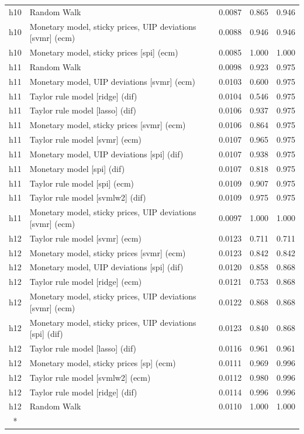 \begin{ThreePartTable}
\begin{longtable}[t]{cp{5.5cm}ccc}
h10 & \raggedright Random Walk & 0.0087 & 0.865 & 0.946\\
h10 & \raggedright Monetary model, sticky prices, UIP deviations [svmr] (ecm) & 0.0088 & 0.946 & 0.946\\
h10 & \raggedright Monetary model, sticky prices [spi] (ecm) & 0.0085 & 1.000 & 1.000\\
\addlinespace
h11 & \raggedright Random Walk & 0.0098 & 0.923 & 0.975\\
h11 & \raggedright Monetary model, UIP deviations [svmr] (ecm) & 0.0103 & 0.600 & 0.975\\
h11 & \raggedright Taylor rule model [ridge] (dif) & 0.0104 & 0.546 & 0.975\\
h11 & \raggedright Taylor rule model [lasso] (dif) & 0.0106 & 0.937 & 0.975\\
h11 & \raggedright Monetary model, sticky prices [svmr] (ecm) & 0.0106 & 0.864 & 0.975\\
h11 & \raggedright Taylor rule model [svmr] (ecm) & 0.0107 & 0.965 & 0.975\\
h11 & \raggedright Monetary model, UIP deviations [spi] (dif) & 0.0107 & 0.938 & 0.975\\
h11 & \raggedright Monetary model [spi] (dif) & 0.0107 & 0.818 & 0.975\\
h11 & \raggedright Taylor rule model [spi] (ecm) & 0.0109 & 0.907 & 0.975\\
h11 & \raggedright Taylor rule model [svmlw2] (dif) & 0.0109 & 0.975 & 0.975\\
h11 & \raggedright Monetary model, sticky prices, UIP deviations [svmr] (ecm) & 0.0097 & 1.000 & 1.000\\
\addlinespace
h12 & \raggedright Taylor rule model [svmr] (ecm) & 0.0123 & 0.711 & 0.711\\
h12 & \raggedright Monetary model, sticky prices [svmr] (ecm) & 0.0123 & 0.842 & 0.842\\
h12 & \raggedright Monetary model, UIP deviations [spi] (dif) & 0.0120 & 0.858 & 0.868\\
h12 & \raggedright Taylor rule model [ridge] (ecm) & 0.0121 & 0.753 & 0.868\\
h12 & \raggedright Monetary model, sticky prices, UIP deviations [svmr] (ecm) & 0.0122 & 0.868 & 0.868\\
h12 & \raggedright Monetary model, sticky prices, UIP deviations [spi] (dif) & 0.0123 & 0.840 & 0.868\\
h12 & \raggedright Taylor rule model [lasso] (dif) & 0.0116 & 0.961 & 0.961\\
h12 & \raggedright Monetary model, sticky prices [sp] (ecm) & 0.0111 & 0.969 & 0.996\\
h12 & \raggedright Taylor rule model [svmlw2] (ecm) & 0.0112 & 0.980 & 0.996\\
h12 & \raggedright Taylor rule model [ridge] (dif) & 0.0114 & 0.996 & 0.996\\
h12 & \raggedright Random Walk & 0.0110 & 1.000 & 1.000\\*
\end{longtable}
\end{ThreePartTable}
\endgroup{}
